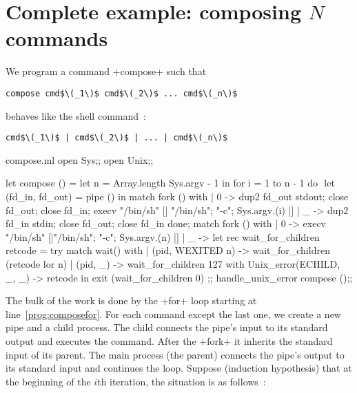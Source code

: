 \section{Complete example: composing $N$ commands}

We program a command \ml+compose+ such that 
\begin{lstlisting}
compose cmd$\(_1\)$ cmd$\(_2\)$ ... cmd$\(_n\)$ 
\end{lstlisting}
behaves like the shell command~:
\begin{lstlisting}
cmd$\(_1\)$ | cmd$\(_2\)$ | ... | cmd$\(_n\)$
\end{lstlisting}
\begin{listingcodefile}[style=numbers]{compose.ml}
open Sys;;
open Unix;;

let compose () =
  let n = Array.length Sys.argv - 1 in
  for i = 1 to n - 1 do $\label{prog:composefor}$
    let (fd_in, fd_out) = pipe () in
    match fork () with
    | 0 ->
        dup2 fd_out stdout;
        close fd_out;
        close fd_in;
        execv "/bin/sh" [| "/bin/sh"; "-c"; Sys.argv.(i) |]
    | _ ->
        dup2 fd_in stdin;
        close fd_out;
        close fd_in
  done;
  match fork () with
  | 0 -> execv "/bin/sh" [|"/bin/sh"; "-c"; Sys.argv.(n) |]
  | _ ->
      let rec wait_for_children retcode =
        try
          match wait() with
          | (pid, WEXITED n) -> wait_for_children (retcode lor n)
          | (pid, _)         -> wait_for_children 127
        with
          Unix_error(ECHILD, _, _) -> retcode in
      exit (wait_for_children 0)
;;
handle_unix_error compose ();;
\end{listingcodefile}
% 
The bulk of the work is done by the \ml+for+ loop starting at
line~\ref{prog:composefor}. For each command except the last one, we
create a new pipe and a child process. The child connects the pipe's
input to its standard output and executes the command. After the
\ml+fork+ it inherits the standard input of its parent. The main
process (the parent) connects the pipe's output to its standard input
and continues the loop. Suppose (induction hypothesis) that at the
beginning of the $i$th iteration, the situation is as follows~:
%
